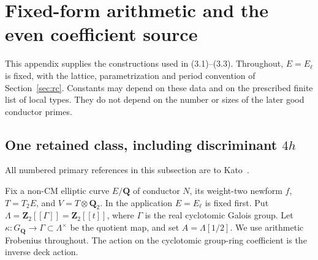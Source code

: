 \documentclass[11pt]{article}
\theoremstyle{definition}
\theoremstyle{remark}
\begin{document}


\section{Fixed-form arithmetic and the even coefficient source}\label{app:even-source}
This appendix supplies the constructions used in (3.1)--(3.3).
Throughout, $E=E_\ell$ is fixed, with the lattice, parametrization and
period convention of Section~\ref{sec:rc}. Constants may depend on these
data and on the prescribed finite list of local types. They do not depend
on the number or sizes of the later good conductor primes.

\subsection{One retained class, including discriminant \texorpdfstring{$4h$}{4h}}
All numbered primary references in this subsection are to Kato~\cite{kato}.

Fix a non-CM elliptic curve $E/\mathbf Q$ of conductor $N$, its weight-two newform $f$,
$T=T_2E$, and $V=T\otimes\mathbf Q_2$. In the application
$E=E_\ell$ is fixed first. Put
$\Lambda=\mathbf Z_2[[\Gamma]]=\mathbf Z_2[[t]]$, where $\Gamma$
is the real cyclotomic Galois group. Let
$\kappa:G_{\mathbf Q}\to\Gamma\subset\Lambda^\times$ be the quotient map,
and set $A=\Lambda[1/2]$.
We use arithmetic Frobenius throughout. The action on the cyclotomic
group-ring coefficient is the inverse deck action.
\end{document}
